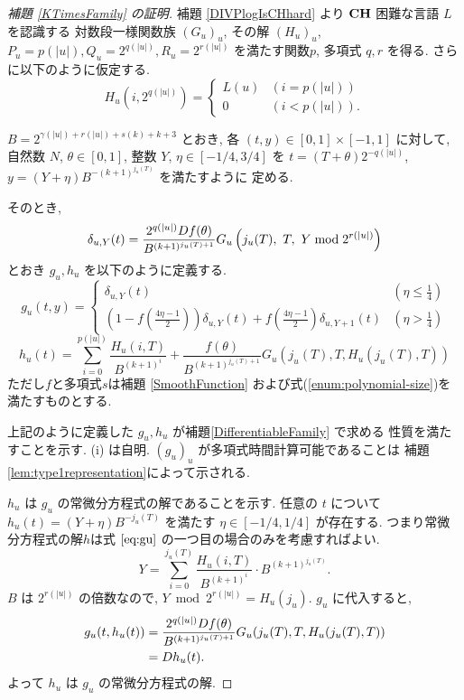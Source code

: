  \begin{proof}[\rm 補題 \ref{KTimesFamily} の証明]
  補題 \ref{DIVPlogIsCHhard} より
  $\mathbf{CH}$ 困難な言語 $L$ を認識する
  対数段一様関数族 $(G_u)_u$, その解 $(H_u)_u$, 
  $P_u = p(|u|), Q_u = 2^{q(|u|)}, R_u = 2^{r(|u|)}$ を満たす関数$p$, 
  多項式 $q,r$ を得る.
  さらに以下のように仮定する.
  \begin{equation}
   H_u(i, 2^{q(|u|)}) = \begin{cases}
			L(u) & (i=p(|u|)) \\
			0 & (i<p(|u|)).
			\end{cases}
  \end{equation}

 $B = 2^{\gamma(|u|) + r(|u|) + s(k) + k + 3}$ とおき, 
 各 $(t, y) \in [0,1] \times [-1, 1]$ に対して,
 自然数 $N$, $\theta \in [0,1]$, 整数 $Y$, $\eta \in [-1/4, 3/4]$ を
 $t = (T + \theta)2^{-q(|u|)}$, $y = (Y + \eta)B^{-(k+1)^{j_u(T)}}$ を満たすように
 定める.
 
 そのとき,
 \begin{equation}
  \delta_{u, Y} (t) = \frac{2^{q(|u|)} D f(\theta)}{B^{(k+1)^{j_u(T)+1}}} 
   G_u\left( j_u(T),\ T,\ Y \bmod 2^{r(|u|)} \right)
 \end{equation}
 とおき $g_u, h_u$ を以下のように定義する.
 \begin{equation}
  \label{eq:gu}
  g_u(t,y) 
  = \begin{cases}
     \delta_{u, Y}(t)
     & (\eta \le \frac 1 4)
     \\
     ( 1-f ( \frac{4\eta-1}{2})) \delta_{u, Y}(t) 
     + f ( \frac{4\eta-1}{2}) \delta_{u,Y+1}(t)
     & (\eta > \frac 1 4)
    \end{cases}
 \end{equation}
 \begin{equation} 
  h_u(t) 
   = \sum^{p(|u|)}_{i=0} \frac{H_u(i, T)}{B^{(k+1)^i}}  
  + \frac{f(\theta)}{B^{(k+1)^{j_u(T)+1}}} G_u(j_u(T), T, H_u(j_u(T), T)) 
  \label{eq:hu}
 \end{equation}
  ただし$f$と多項式$s$は補題 \ref{SmoothFunction}
  および式(\ref{enum:polynomial-size})を満たすものとする.


 上記のように定義した $g_u, h_u$ が補題\ref{DifferentiableFamily} で求める
 性質を満たすことを示す. (i) は自明. 
 $(g_u)_u$ が多項式時間計算可能であることは
  補題 \ref{lem:type1representation}によって示される.


 $h_u$ は $g_u$ の常微分方程式の解であることを示す.
 任意の $t$ について $h_u(t) = (Y + \eta) B^{-j_u(T)}$ を満たす 
 $\eta \in [-1/4, 1/4]$ が存在する. 
 つまり常微分方程式の解$h$は式 $\ref{eq:gu}$ の一つ目の場合のみを考慮すればよい.
 \begin{equation}
  Y = \sum_{i=0}^{j_u(T)} \frac{H_u(i, T)}{B^{(k+1)^i}} \cdot B^{(k+1)^{j_u(T)}}.
 \end{equation}
 $B$ は $2^{r(|u|)}$ の倍数なので,  $Y \bmod 2^{r(|u|)} = H_u(j_u)$. 
 $g_u$ に代入すると,
 \begin{align*}
   g_u(t, h_u(t)) 
  & =  \frac{2^{q(|u|)} D f(\theta)}{B^{(k+1)^{j_u(T)+1}}}
   G_u(j_u(T), T, H_u(j_u(T), T)) \\
  & =  D h_u(t).
 \end{align*}
 よって $h_u$ は $g_u$ の常微分方程式の解.


\end{proof}
